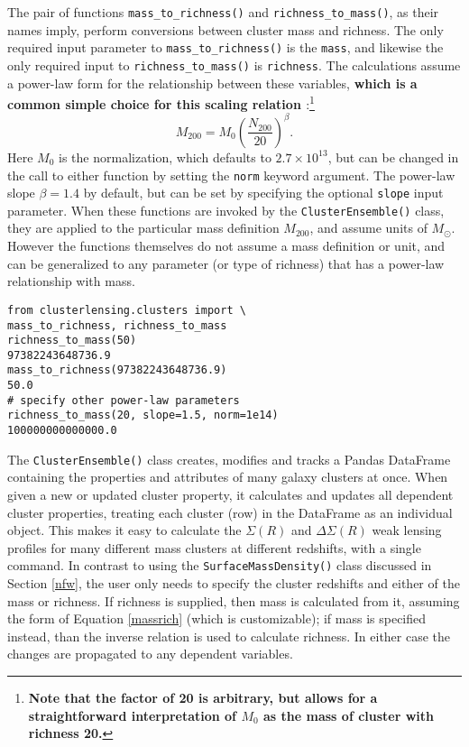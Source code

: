 \documentclass[twocolumn]{aastex6}
\newcommand{\code}{\lstinline[style=codeintext]}
\begin{document}
The pair of functions \code{mass_to_richness()} and \code{richness_to_mass()}, as their names imply, perform conversions between cluster mass and richness. The only required input parameter to \code{mass_to_richness()} is the \code{mass}, and likewise the only required input to \code{richness_to_mass()} is \code{richness}. The calculations assume a power-law form for the relationship between these variables, {\bf which is a common simple choice for this scaling relation \citep[e.g.][]{Johnston07, Mandelbaum08b, Andreon10}}:\footnote{\bf Note that the factor of 20 is arbitrary, but allows for a straightforward interpretation of $M_0$ as the mass of cluster with richness 20.}
\begin{equation}\label{massrich}
M_{200} = M_0 \left( \frac{N_{200}}{20} \right) ^ \beta.
\end{equation}
Here $M_0$ is the normalization, which defaults to $2.7 \times 10^{13}$, but can be changed in the call to either function by setting the \code{norm} keyword argument. The power-law slope $\beta = 1.4$ by default, but can be set by specifying the optional \code{slope} input parameter. When these functions are invoked by the \code{ClusterEnsemble()} class, they are applied to the particular mass definition $M_{200}$, and assume units of $M_{\odot}$. However the functions themselves do not assume a mass definition or unit, and can be generalized to any parameter (or type of richness) that has a power-law relationship with mass.

\begin{lstlisting}
from clusterlensing.clusters import \
mass_to_richness, richness_to_mass
richness_to_mass(50)
97382243648736.9
mass_to_richness(97382243648736.9)
50.0
# specify other power-law parameters
richness_to_mass(20, slope=1.5, norm=1e14)
100000000000000.0
\end{lstlisting}

The \code{ClusterEnsemble()} class creates, modifies and tracks a Pandas DataFrame containing the properties and attributes of many galaxy clusters at once. When given a new or updated cluster property, it calculates and updates all dependent cluster properties, treating each cluster (row) in the DataFrame as an individual object. This makes it easy to calculate the $\Sigma(R)$ and $\Delta\Sigma(R)$ weak lensing profiles for many different mass clusters at different redshifts, with a single command. In contrast to using the \code{SurfaceMassDensity()} class discussed in Section \ref{nfw}, the user only needs to specify the cluster redshifts and either of the mass or richness. If richness is supplied, then mass is calculated from it, assuming the form of Equation \ref{massrich} (which is customizable); if mass is specified instead, than the inverse relation is used to calculate richness. In either case the changes are propagated to any dependent variables.
\end{document}
